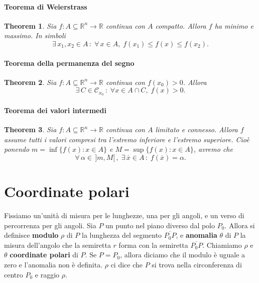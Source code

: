 \documentclass{article}
\theoremstyle{plain}
\newtheorem{thm}{Theorem}[section]
\theoremstyle{definition}
\theoremstyle{remark}
\begin{document}
\paragraph{Teorema di Weierstrass}
\begin{bxthm}
\begin{thm}
    Sia $f:A\subseteq\mathbb{R}^n\to\mathbb{R}$ continua con $A$ compatto.
    Allora $f$ ha minimo e massimo. In simboli 
    \[\exists\,x_1,x_2\in A\,:\;\forall\, x\in A,\;f(x_1)\leq f(x)\leq f(x_2).\]
\end{thm}
\end{bxthm}

\vspace{10pt}

\paragraph{Teorema della permanenza del segno}
\begin{bxthm}
\begin{thm}
    Sia $f:A\subseteq\mathbb{R}^n\to\mathbb{R}$ continua con $f(x_0)>0$. Allora 
    \[\exists\,C\in\mathcal{C}_{x_0}\,:\;\forall x\in A\cap C,\; f(x)>0.\]
\end{thm}
\end{bxthm}

\vspace{10pt}

\paragraph{Teorema dei valori intermedi}
\begin{bxthm}
\begin{thm}
    Sia $f:A\subseteq\mathbb{R}^n\to\mathbb{R}$ continua con $A$ limitato e connesso.
    Allora $f$ assume tutti i valori compresi tra l'estremo inferiore e l'estremo superiore.
    Cioè ponendo $m=\inf\{f(x):x\in A\}$ e $M=\sup\{f(x):x\in A\}$, avremo che 
    \[\forall\,\alpha\in\,]m,M[\,,\;\exists\,\overline{x}\in A\,:\;f(\overline{x})=\alpha.\]
\end{thm}
\end{bxthm}

\vspace{10pt}

\section{Coordinate polari}

\vspace{10pt}
Fissiamo un'unità di misura per le lunghezze, una per gli angoli, e un verso di percorrenza per gli angoli.
Sia $P$ un punto nel piano diverso dal polo $P_0$.
Allora si definisce \textbf{modulo} $\rho$ di $P$ la lunghezza del segmento $\overline{P_0P}$, e 
\textbf{anomalia} $\theta$ di $P$ la misura dell'angolo che la semiretta $r$ forma con la semiretta $\overline{P_0P}$.
Chiamiamo $\rho$ e $\theta$ \textbf{coordinate polari} di $P$.
Se $P=P_0$, allora diciamo che il modulo è uguale a zero e l'anomalia non è definita.
$\rho$ ci dice che $P$ si trova nella circonferenza di centro $P_0$ e raggio $\rho$.
\end{document}
